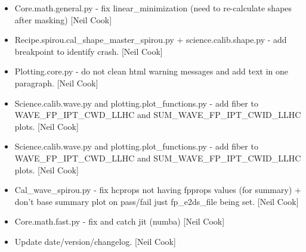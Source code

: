 \documentclass[a4paper,10pt,english]{report}
\begin{document}
\begin{itemize}
\item {} 
Core.math.general.py - fix linear\_minimization (need to re-calculate
shapes after masking) {[}Neil Cook{]}

\item {} 
Recipe.spirou.cal\_shape\_master\_spirou.py + science.calib.shape.py -
add breakpoint to identify crash. {[}Neil Cook{]}

\item {} 
Plotting.core.py - do not clean html warning messages and add text in
one paragraph. {[}Neil Cook{]}

\item {} 
Science.calib.wave.py and plotting.plot\_functions.py - add fiber to
WAVE\_FP\_IPT\_CWD\_LLHC and SUM\_WAVE\_FP\_IPT\_CWID\_LLHC plots. {[}Neil Cook{]}

\item {} 
Science.calib.wave.py and plotting.plot\_functions.py - add fiber to
WAVE\_FP\_IPT\_CWD\_LLHC and SUM\_WAVE\_FP\_IPT\_CWID\_LLHC plots. {[}Neil Cook{]}

\item {} 
Cal\_wave\_spirou.py - fix hcprops not having fpprops values (for
summary) + don’t base summary plot on pass/fail just fp\_e2ds\_file
being set. {[}Neil Cook{]}

\item {} 
Core.math.fast.py - fix and catch jit (numba) {[}Neil Cook{]}

\item {} 
Update date/version/changelog. {[}Neil Cook{]}

\end{itemize}
\end{document}
